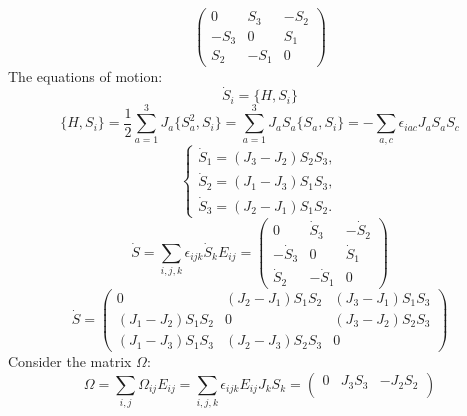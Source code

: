 \documentclass[12pt]{article}
\theoremstyle{definition}
\begin{document}
\begin{enumerate}
\begin{itemize}
\begin{equation}
\begin{pmatrix}
                0 & S_3 & -S_2\\
                -S_3 & 0 & S_1\\
                S_2 & -S_1 & 0
            \end{pmatrix}
        \end{equation}
        The equations of motion:
        \begin{equation}
            \dot{S}_i=\{H,S_i\}
        \end{equation}
        \begin{equation}
            \{H,S_i\}=\frac{1}{2}\sum\limits_{a=1}^3J_a\{S_a^2,S_i\}=\sum\limits_{a=1}^3J_aS_a\{S_a,S_i\}=-\sum\limits_{a,c}\epsilon_{iac}J_aS_aS_c
        \end{equation}
        \begin{equation}
            \begin{cases}
                \dot{S}_1=(J_3-J_2)S_2S_3,\\
                \dot{S}_2=(J_1-J_3)S_1S_3,\\
                \dot{S}_3=(J_2-J_1)S_1S_2.
            \end{cases}
        \end{equation}
        \begin{equation}
            \dot{S}=\sum\limits_{i,j,k}\epsilon_{ijk}\dot{S}_kE_{ij}=\begin{pmatrix}
                0 & \dot{S}_3 & -\dot{S}_2\\
                -\dot{S}_3 & 0 & \dot{S}_1\\
                \dot{S}_2 & -\dot{S}_1 & 0
            \end{pmatrix}
        \end{equation}
        \begin{equation}
            \dot{S}=\begin{pmatrix}
                0 & (J_2-J_1)S_1S_2 & (J_3-J_1)S_1S_3\\
                (J_1-J_2)S_1S_2 & 0 & (J_3-J_2)S_2S_3\\
                (J_1-J_3)S_1S_3 & (J_2-J_3)S_2S_3 & 0
            \end{pmatrix}
        \end{equation}
        Consider the matrix $\Omega$:
        \begin{equation}
            \Omega=\sum\limits_{i,j}\Omega_{ij}E_{ij}=\sum\limits_{i,j,k}\epsilon_{ijk}E_{ij}J_kS_k=\begin{pmatrix}
                0 & J_3S_3 & -J_2S_2\\

\end{pmatrix}
\end{equation}
\end{itemize}
\end{enumerate}
\end{document}

